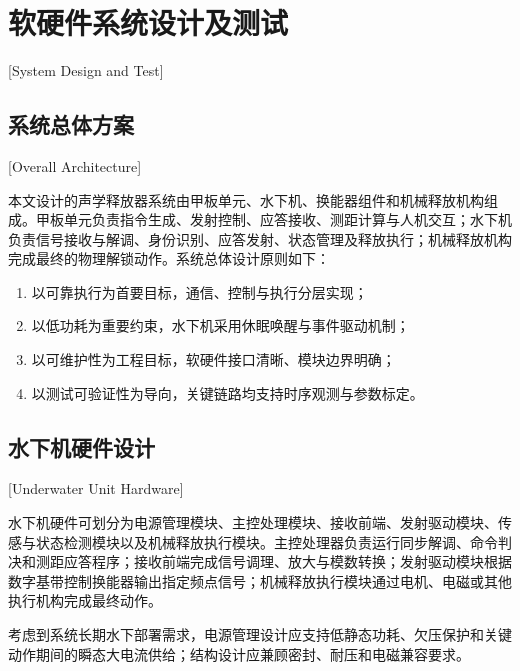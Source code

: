 
%
%

\chapter{软硬件系统设计及测试}[System Design and Test]
\label{chap05}

\section{系统总体方案}[Overall Architecture]

本文设计的声学释放器系统由甲板单元、水下机、换能器组件和机械释放机构组成。甲板单元负责指令生成、发射控制、应答接收、测距计算与人机交互；水下机负责信号接收与解调、身份识别、应答发射、状态管理及释放执行；机械释放机构完成最终的物理解锁动作。系统总体设计原则如下：

\begin{enumerate}
  \item 以可靠执行为首要目标，通信、控制与执行分层实现；
  \item 以低功耗为重要约束，水下机采用休眠唤醒与事件驱动机制；
  \item 以可维护性为工程目标，软硬件接口清晰、模块边界明确；
  \item 以测试可验证性为导向，关键链路均支持时序观测与参数标定。
\end{enumerate}

\section{水下机硬件设计}[Underwater Unit Hardware]

水下机硬件可划分为电源管理模块、主控处理模块、接收前端、发射驱动模块、传感与状态检测模块以及机械释放执行模块。主控处理器负责运行同步解调、命令判决和测距应答程序；接收前端完成信号调理、放大与模数转换；发射驱动模块根据数字基带控制换能器输出指定频点信号；机械释放执行模块通过电机、电磁或其他执行机构完成最终动作\cite{XiaDongShengXueShiFangQiShuZiDianLuSheJiYuShiXian2011,XieShuangWenXinXingShengXueShiFangQiKongZhiDianLuDeSheJiYuZhiZuo2018,ChenKaiYunShengXueShiFangQiJiJieShiFangDanYuanDuoYuWuLiJianMoYuShiYanYanJiu2024}。

考虑到系统长期水下部署需求，电源管理设计应支持低静态功耗、欠压保护和关键动作期间的瞬态大电流供给；结构设计应兼顾密封、耐压和电磁兼容要求。

